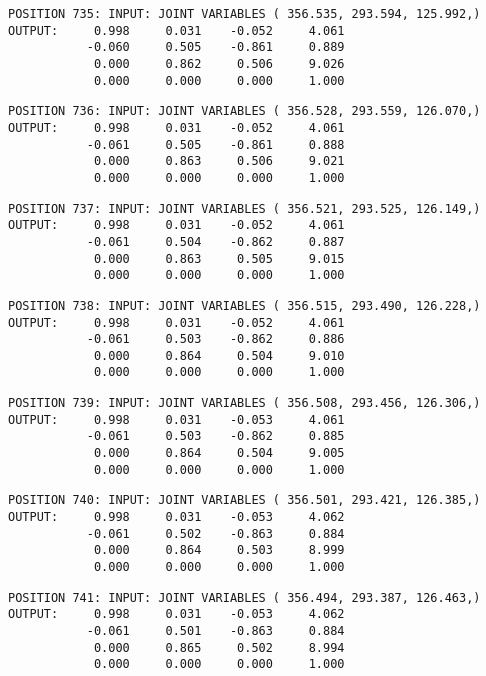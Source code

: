 \begin{verbatim}
POSITION 735: INPUT: JOINT VARIABLES ( 356.535, 293.594, 125.992,)
OUTPUT:     0.998     0.031    -0.052     4.061
           -0.060     0.505    -0.861     0.889
            0.000     0.862     0.506     9.026
            0.000     0.000     0.000     1.000
\end{verbatim} \pagebreak[1]\begin{verbatim}
POSITION 736: INPUT: JOINT VARIABLES ( 356.528, 293.559, 126.070,)
OUTPUT:     0.998     0.031    -0.052     4.061
           -0.061     0.505    -0.861     0.888
            0.000     0.863     0.506     9.021
            0.000     0.000     0.000     1.000
\end{verbatim} \pagebreak[1]\begin{verbatim}
POSITION 737: INPUT: JOINT VARIABLES ( 356.521, 293.525, 126.149,)
OUTPUT:     0.998     0.031    -0.052     4.061
           -0.061     0.504    -0.862     0.887
            0.000     0.863     0.505     9.015
            0.000     0.000     0.000     1.000
\end{verbatim} \pagebreak[1]\begin{verbatim}
POSITION 738: INPUT: JOINT VARIABLES ( 356.515, 293.490, 126.228,)
OUTPUT:     0.998     0.031    -0.052     4.061
           -0.061     0.503    -0.862     0.886
            0.000     0.864     0.504     9.010
            0.000     0.000     0.000     1.000
\end{verbatim} \pagebreak[1]\begin{verbatim}
POSITION 739: INPUT: JOINT VARIABLES ( 356.508, 293.456, 126.306,)
OUTPUT:     0.998     0.031    -0.053     4.061
           -0.061     0.503    -0.862     0.885
            0.000     0.864     0.504     9.005
            0.000     0.000     0.000     1.000
\end{verbatim} \pagebreak[1]\begin{verbatim}
POSITION 740: INPUT: JOINT VARIABLES ( 356.501, 293.421, 126.385,)
OUTPUT:     0.998     0.031    -0.053     4.062
           -0.061     0.502    -0.863     0.884
            0.000     0.864     0.503     8.999
            0.000     0.000     0.000     1.000
\end{verbatim} \pagebreak[1]\begin{verbatim}
POSITION 741: INPUT: JOINT VARIABLES ( 356.494, 293.387, 126.463,)
OUTPUT:     0.998     0.031    -0.053     4.062
           -0.061     0.501    -0.863     0.884
            0.000     0.865     0.502     8.994
            0.000     0.000     0.000     1.000
\end{verbatim} \pagebreak[1]\begin{verbatim}

\end{verbatim}
